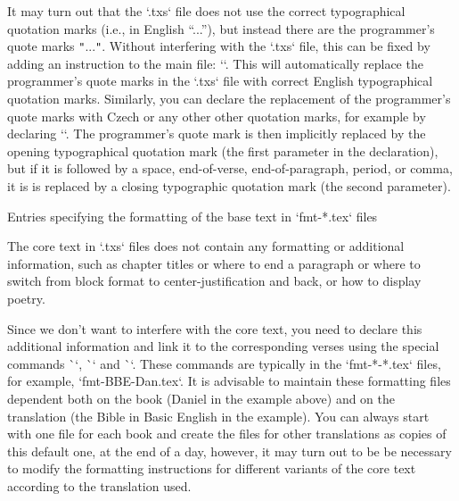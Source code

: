 It may turn out that the `.txs` file does not use the correct typographical quotation marks (i.e., in English “...”), but instead there are the programmer's quote marks {\tt"}...{\tt"}. 
Without interfering with the `.txs` file, this can be fixed by adding an instruction to
the main file:
``.
This will automatically replace the programmer's quote marks in the `.txs` file with correct English  typographical quotation marks. 
Similarly, you can declare the replacement of the programmer's quote marks
with Czech or any other other quotation marks, for example by declaring
``.
The programmer's quote mark is then implicitly
replaced by the opening typographical quotation mark (the first parameter in the 
declaration), but if it is followed by a space, end-of-verse, end-of-paragraph, period, 
or comma, it is is replaced by a closing typographic quotation mark (the second 
parameter).

\secc[fmt] Entries specifying the formatting of the base text in `fmt-*.tex` files

The core text in `.txs` files does not contain any formatting or additional information, 
such as chapter titles or where to end a paragraph or where to switch from block format 
to center-justification   and back, or how to display poetry.


Since we don't want to interfere with the core text, 
you need to declare this 
additional information and link it to the corresponding verses using the special 
commands \`\fmtadd`, \`\fmtpre` and \`\fmtins`. 
These commands are typically in the `fmt-*-*.tex` files,
for example, `fmt-BBE-Dan.tex`. It is advisable to maintain these formatting files
dependent both on the book (Daniel in the example above) and on the translation (the Bible in Basic English in the example). 
You can always  start with one file for each book and  create the files for  other translations as copies of this default one,  at the end of a day, 
however, it may turn out to be be necessary to modify the formatting instructions for different variants of the core text according to the 
translation used.


